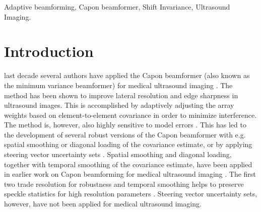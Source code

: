 \documentclass[draftcls]{IEEEtran}
\begin{document}
\begin{IEEEkeywords}
Adaptive beamforming, Capon beamformer, Shift Invariance, Ultrasound Imaging.
\end{IEEEkeywords}






%
\IEEEpeerreviewmaketitle



\section{Introduction}
% 
% 
% 
% 

 last decade several authors have applied the Capon beamformer (also known as the minimum variance beamformer) for medical ultrasound imaging \cite{Synnevag2007, Vignon2008, Viola}. The method has been shown to improve lateral resolution and edge sharpness \cite{Synnevag2007, Synnevag2009, Chen2011} in ultrasound images. This is accomplished by adaptively adjusting the array weights based on element-to-element covariance in order to minimize interference. The method is, however, also highly sensitive to model errors \cite{Mestre2006, Widrow1982, Wax1996, Wax1996a}. This has led to the development of several robust versions of the Capon beamformer with e.g. spatial smoothing \cite{Shan1985} or diagonal loading \cite{JianLi2003} of the covariance estimate, or by applying steering vector uncertainty sets \cite{Lorenz2005, Rubsamen2013}. Spatial smoothing and diagonal loading, together with temporal smoothing of the covariance estimate, have been applied in earlier work on Capon beamforming for medical ultrasound imaging \cite{Synnevag2009}. The first two trade resolution for robustness and temporal smoothing helps to preserve speckle statistics for high resolution parameters \cite{Synnevag2007a}. Steering vector uncertainty sets, however, have not been applied for medical ultrasound imaging.
\end{document}
